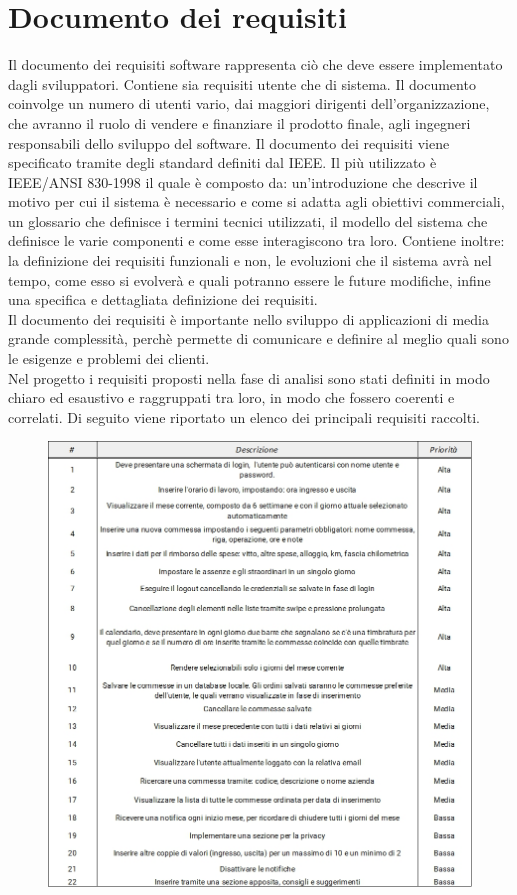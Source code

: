 \documentclass[12pt]{report}
\begin{document}
\section{Documento dei requisiti}
Il documento dei requisiti software rappresenta ciò che deve essere implementato dagli sviluppatori. Contiene sia requisiti utente che di sistema. Il documento coinvolge un numero di utenti vario, dai maggiori dirigenti dell'organizzazione, che avranno il ruolo di vendere e finanziare il prodotto finale, agli ingegneri responsabili dello sviluppo del software. Il documento dei requisiti viene specificato tramite degli standard definiti dal IEEE. Il più utilizzato è IEEE/ANSI 830-1998\cite{IEEEANSI830} il quale è composto da: un'introduzione che descrive il motivo per cui il sistema è necessario e come si adatta agli obiettivi commerciali, un glossario che definisce i termini tecnici utilizzati, il modello del sistema che definisce le varie componenti e come esse interagiscono tra loro. Contiene inoltre: la definizione dei requisiti funzionali e non, le evoluzioni che il sistema avrà nel tempo, come esso si evolverà e quali potranno essere le future modifiche, infine una specifica e dettagliata definizione dei requisiti.\\
Il documento dei requisiti è importante nello sviluppo di applicazioni di media grande complessità, perchè permette di comunicare e definire al meglio quali sono le esigenze e problemi dei clienti.\\
Nel progetto i requisiti proposti nella fase di analisi sono stati definiti in modo chiaro ed esaustivo e raggruppati tra loro, in modo che fossero coerenti e correlati.
Di seguito viene riportato un elenco dei principali requisiti raccolti.

\begin{figure}[h]
	\hspace*{-2,6cm}
	\includegraphics[width=1.3\linewidth]{immagini/tabella_requisiti}
\end{figure}
%
\end{document}
